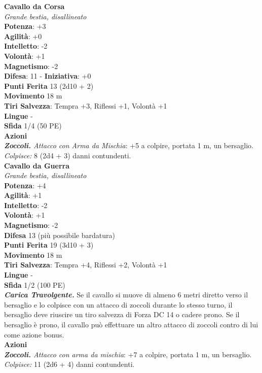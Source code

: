 \begin{multicols}{2}
\medskip\textbf{Cavallo da Corsa}\\
\emph{Grande bestia, disallineato}\\
\textbf{Potenza}: +3\\
\textbf{Agilità}: +0\\
\textbf{Intelletto}: -2\\
\textbf{Volontà}: +1\\
\textbf{Magnetismo}: -2\\
\textbf{Difesa}: 11 - \textbf{Iniziativa}: +0\\
\textbf{Punti Ferita} 13 (2d10 + 2)\\
\textbf{Movimento} 18 m\\
\textbf{Tiri Salvezza}: Tempra +3, Riflessi +1, Volontà +1 \\
\textbf{Lingue} -\\
\textbf{Sfida} 1/4 (50 PE)\smallskip\\
\smallskip\textbf{Azioni}\\
\emph{\textbf{Zoccoli.} Attacco con Arma da Mischia}: +5 a colpire, portata 1 m, un bersaglio.\\
\emph{Colpisce:} 8 (2d4 + 3) danni contundenti.\\

\medskip\textbf{Cavallo da Guerra}\\
\emph{Grande bestia, disallineato}\\
\textbf{Potenza}: +4\\
\textbf{Agilità}: +1\\
\textbf{Intelletto}: -2\\
\textbf{Volontà}: +1\\
\textbf{Magnetismo}: -2\\
\textbf{Difesa} 13 (più possibile bardatura)\\
\textbf{Punti Ferita} 19 (3d10 + 3)\\
\textbf{Movimento} 18 m\\
\textbf{Tiri Salvezza}:  Tempra +4, Riflessi +2, Volontà +1 \\
\textbf{Lingue} -\\
\textbf{Sfida} 1/2 (100 PE)\smallskip\\
\emph{\textbf{Carica Travolgente.}} Se il cavallo si muove di almeno 6 metri diretto verso il bersaglio e lo colpisce con un attacco di zoccoli durante lo stesso turno, il bersaglio deve riuscire un tiro salvezza di Forza DC 14 o cadere prono. Se il bersaglio è prono, il cavallo può effettuare un altro attacco di zoccoli contro di lui come azione bonus. \\
\smallskip\textbf{Azioni}\\
\emph{\textbf{Zoccoli.} Attacco con arma da mischia}: +7 a colpire, portata 1 m, un bersaglio.\\
\emph{Colpisce:} 11 (2d6 + 4) danni contundenti.\\


\end{multicols}
